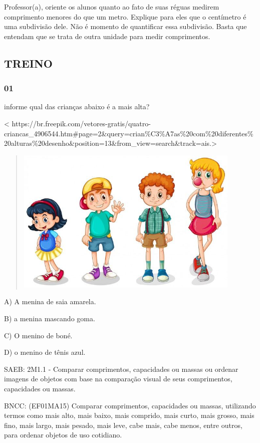 Professor(a), oriente os alunos quanto ao fato de suas réguas medirem
comprimento menores do que um metro. Explique para eles que o centímetro
é uma subdivisão dele. Não é momento de quantificar essa subdivisão.
Basta que entendam que se trata de outra unidade para medir
comprimentos.

\subsection{TREINO}\label{treino-2}

\subsubsection{01}\label{section-36}

informe qual das crianças abaixo é a mais alta?

\textless{}
https://br.freepik.com/vetores-gratis/quatro-criancas\_4906544.htm\#page=2\&query=crian\%C3\%A7as\%20com\%20diferentes\%20alturas\%20desenho\&position=13\&from\_view=search\&track=ais.\textgreater{}

\begin{quote}
\includegraphics[width=4.23198in,height=2.75148in]{media/image32.jpg}
\end{quote}

A) A menina de saia amarela.

B) a menina mascando goma.

C) O menino de boné.

D) o menino de tênis azul.

SAEB: 2M1.1 - Comparar comprimentos, capacidades ou massas ou ordenar
imagens de objetos com base na comparação visual de seus comprimentos,
capacidades ou massas.

BNCC: (EF01MA15) Comparar comprimentos, capacidades ou massas,
utilizando termos como mais alto, mais baixo, mais comprido, mais curto,
mais grosso, mais fino, mais largo, mais pesado, mais leve, cabe mais,
cabe menos, entre outros, para ordenar objetos de uso cotidiano.

